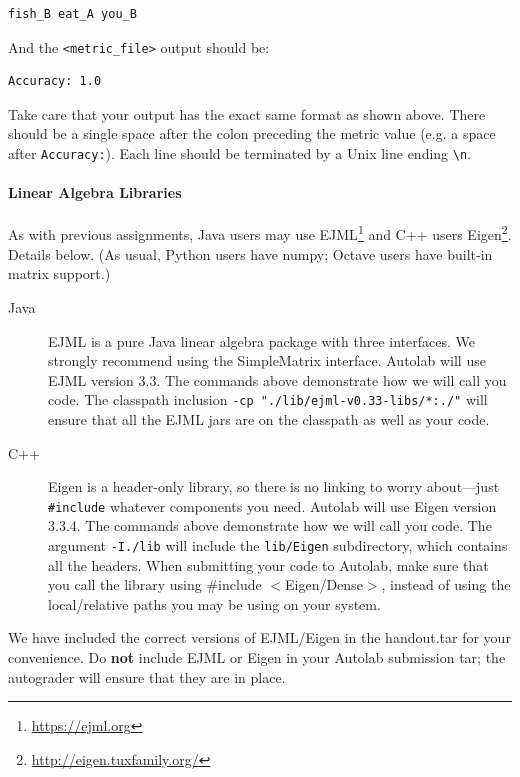\documentclass{article}
\begin{document}
\begin{lstlisting}
fish_B eat_A you_B
\end{lstlisting}

And the \texttt{<metric\_file>} output should be:

\begin{lstlisting}
Accuracy: 1.0
\end{lstlisting}

Take care that your output has the exact same format as shown above. There should be a single space after the colon preceding the metric value (e.g. a space after \lstinline{Accuracy:}). Each line should be terminated by a Unix line ending \lstinline{\n}.

\begin{notebox}
\paragraph{Linear Algebra Libraries} As with previous assignments, Java users may use EJML\footnote{\url{https://ejml.org}} and C++ users Eigen\footnote{\url{http://eigen.tuxfamily.org/}}. Details below. 
%
(As usual, Python users have numpy; Octave users have built-in matrix support.)
%
\begin{description}
\item[Java] EJML is a pure Java linear algebra package with three interfaces. We strongly recommend using the SimpleMatrix interface. Autolab will use EJML version 3.3. The commands above demonstrate how we will call you code. The classpath inclusion \lstinline{-cp "./lib/ejml-v0.33-libs/*:./"} will ensure that all the EJML jars are on the classpath as well as your code. 
\item[C++] Eigen is a header-only library, so there is no linking to worry about---just \lstinline{#include} whatever components you need. Autolab will use Eigen version 3.3.4. The commands above demonstrate how we will call you code. The argument \lstinline{-I./lib} will include the \lstinline{lib/Eigen} subdirectory, which contains all the headers. When submitting your code to Autolab, make sure that you call the library using \#include $<$Eigen/Dense$>$, instead of using the local/relative paths you may be using on your system.
\end{description} 
We have included the correct versions of EJML/Eigen in the handout.tar for your convenience. Do {\bf not} include EJML or Eigen in your Autolab submission tar; the autograder will ensure that they are in place. 
\end{notebox}
    
\end{document}
